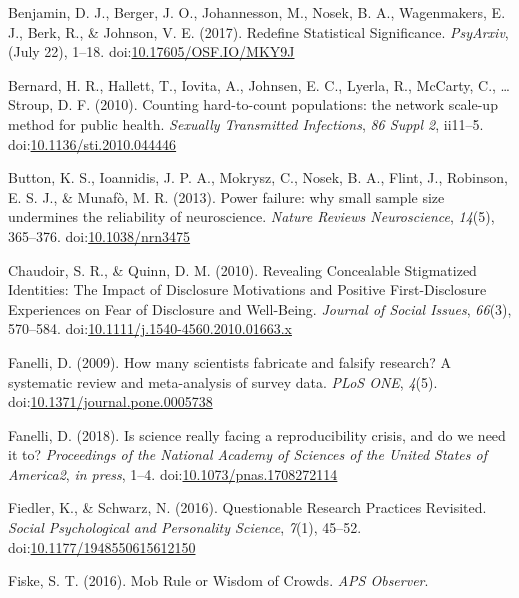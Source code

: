 \documentclass[,jou]{apa6}
\theoremstyle{definition}
\theoremstyle{definition}
\theoremstyle{definition}
\theoremstyle{remark}
\begin{document}
\hypertarget{ref-Benjamin2017}{}
Benjamin, D. J., Berger, J. O., Johannesson, M., Nosek, B. A.,
Wagenmakers, E. J., Berk, R., \& Johnson, V. E. (2017). Redefine
Statistical Significance. \emph{PsyArxiv}, (July 22), 1--18.
doi:\href{https://doi.org/10.17605/OSF.IO/MKY9J}{10.17605/OSF.IO/MKY9J}

\hypertarget{ref-Bernard2010}{}
Bernard, H. R., Hallett, T., Iovita, A., Johnsen, E. C., Lyerla, R.,
McCarty, C., \ldots{} Stroup, D. F. (2010). Counting hard-to-count
populations: the network scale-up method for public health.
\emph{Sexually Transmitted Infections}, \emph{86 Suppl 2}, ii11--5.
doi:\href{https://doi.org/10.1136/sti.2010.044446}{10.1136/sti.2010.044446}

\hypertarget{ref-Button2013}{}
Button, K. S., Ioannidis, J. P. A., Mokrysz, C., Nosek, B. A., Flint,
J., Robinson, E. S. J., \& Munafò, M. R. (2013). Power failure: why
small sample size undermines the reliability of neuroscience.
\emph{Nature Reviews Neuroscience}, \emph{14}(5), 365--376.
doi:\href{https://doi.org/10.1038/nrn3475}{10.1038/nrn3475}

\hypertarget{ref-Chaudoir2010}{}
Chaudoir, S. R., \& Quinn, D. M. (2010). Revealing Concealable
Stigmatized Identities: The Impact of Disclosure Motivations and
Positive First-Disclosure Experiences on Fear of Disclosure and
Well-Being. \emph{Journal of Social Issues}, \emph{66}(3), 570--584.
doi:\href{https://doi.org/10.1111/j.1540-4560.2010.01663.x}{10.1111/j.1540-4560.2010.01663.x}

\hypertarget{ref-Fanelli2009a}{}
Fanelli, D. (2009). How many scientists fabricate and falsify research?
A systematic review and meta-analysis of survey data. \emph{PLoS ONE},
\emph{4}(5).
doi:\href{https://doi.org/10.1371/journal.pone.0005738}{10.1371/journal.pone.0005738}

\hypertarget{ref-Fanelli2018}{}
Fanelli, D. (2018). Is science really facing a reproducibility crisis,
and do we need it to? \emph{Proceedings of the National Academy of
Sciences of the United States of America2}, \emph{in press}, 1--4.
doi:\href{https://doi.org/10.1073/pnas.1708272114}{10.1073/pnas.1708272114}

\hypertarget{ref-Fiedler2016}{}
Fiedler, K., \& Schwarz, N. (2016). Questionable Research Practices
Revisited. \emph{Social Psychological and Personality Science},
\emph{7}(1), 45--52.
doi:\href{https://doi.org/10.1177/1948550615612150}{10.1177/1948550615612150}

\hypertarget{ref-Fiske2016}{}
Fiske, S. T. (2016). Mob Rule or Wisdom of Crowds. \emph{APS Observer}.
\end{document}
